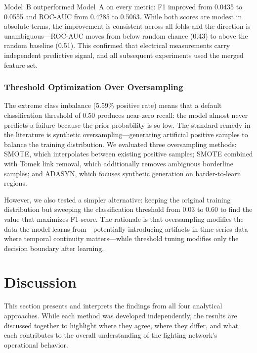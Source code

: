 \documentclass{article}
\begin{document}
Model~B outperformed Model~A on every metric: F1 improved from 0.0435 to 0.0555 and ROC-AUC from 0.4285 to 0.5063. While both scores are modest in absolute terms, the improvement is consistent across all folds and the direction is unambiguous---ROC-AUC moves from below random chance (0.43) to above the random baseline (0.51). This confirmed that electrical measurements carry independent predictive signal, and all subsequent experiments used the merged feature set.

\subsubsection{Threshold Optimization Over Oversampling}

The extreme class imbalance (5.59\% positive rate) means that a default classification threshold of 0.50 produces near-zero recall: the model almost never predicts a failure because the prior probability is so low. The standard remedy in the literature is synthetic oversampling---generating artificial positive samples to balance the training distribution. We evaluated three oversampling methods: SMOTE, which interpolates between existing positive samples; SMOTE combined with Tomek link removal, which additionally removes ambiguous borderline samples; and ADASYN, which focuses synthetic generation on harder-to-learn regions.

However, we also tested a simpler alternative: keeping the original training distribution but sweeping the classification threshold from 0.03 to 0.60 to find the value that maximizes F1-score. The rationale is that oversampling modifies the data the model learns from---potentially introducing artifacts in time-series data where temporal continuity matters---while threshold tuning modifies only the decision boundary after learning.


\section{Discussion}

This section presents and interprets the findings from all four analytical approaches. While each method was developed independently, the results are discussed together to highlight where they agree, where they differ, and what each contributes to the overall understanding of the lighting network's operational behavior.
\end{document}
